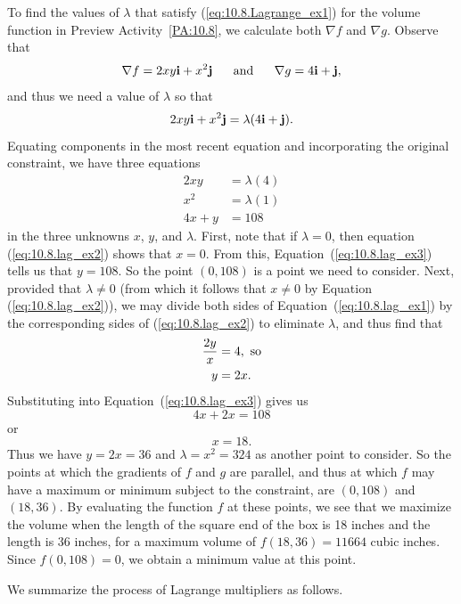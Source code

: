 To find the values of $\lambda$ that satisfy (\ref{eq:10.8.Lagrange_ex1}) for the volume function in Preview Activity~\ref{PA:10.8}, we calculate both $\nabla f$ and $\nabla g$. Observe that
\[\nabla f = 2xy \vi + x^2 \vj \ \ \ \ \text{ and } \ \ \ \ \nabla g = 4\vi + \vj,\]
and thus we need a value of $\lambda$ so that
\[2xy \mathbf{i} + x^2 \mathbf{j} = \lambda(4\mathbf{i} + \mathbf{j}).\]
Equating components in the most recent equation and incorporating the original constraint, we have three equations
\begin{align}
2xy &= \lambda (4) \label{eq:10.8.lag_ex1} \\
x^2 &= \lambda (1) \label{eq:10.8.lag_ex2} \\
4x+y &= 108 \label{eq:10.8.lag_ex3}
\end{align}
in the three unknowns $x$, $y$, and $\lambda$. First, note that if $\lambda = 0$, then equation (\ref{eq:10.8.lag_ex2}) shows that $x=0$. From this, Equation~(\ref{eq:10.8.lag_ex3}) tells us that $y = 108$. So the point $(0,108)$ is a point we need to consider. Next, provided that $\lambda \neq 0$ (from which it follows that $x \neq 0$ by Equation (\ref{eq:10.8.lag_ex2})), we may divide both sides of Equation~(\ref{eq:10.8.lag_ex1}) by the corresponding sides of (\ref{eq:10.8.lag_ex2}) to eliminate $\lambda$, and thus find that
\begin{align*} 
\frac{2y}{x} &= 4, \ \mbox{so} \\ \notag
y &= 2x. \label{eq:10.8.lag_ex4}
\end{align*}
Substituting into Equation~(\ref{eq:10.8.lag_ex3}) gives us
\[4x+2x = 108\]
or
\[x = 18.\]
Thus we have $y = 2x = 36$ and $\lambda = x^2 = 324$ as another point to consider. So the points at which the gradients of $f$ and $g$ are parallel, and thus at which $f$ may have a maximum or minimum subject to the constraint, are $(0,108)$ and $(18,36)$.  By evaluating the function $f$ at these points, we see that we maximize the volume when the length of the square end of the box is 18 inches and the length is 36 inches, for a maximum volume of $f(18,36) = 11664$ cubic inches. Since $f(0,108) = 0$, we obtain a minimum value at this point. %

We summarize the process of Lagrange multipliers as follows. 

\vspace*{5pt}
\nin {}
\vspace*{5pt}

